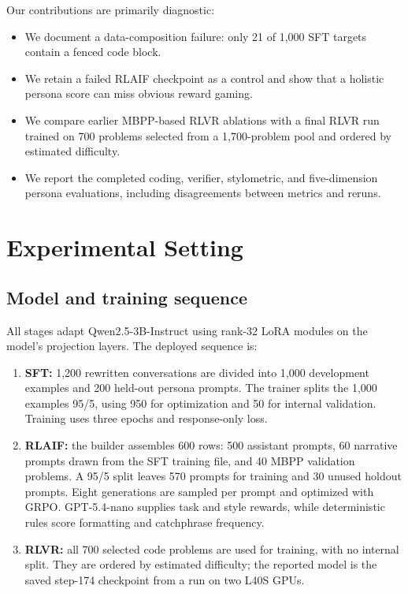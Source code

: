 \documentclass[10pt,twocolumn]{article}
\begin{document}
Our contributions are primarily diagnostic:
\begin{itemize}
    \item We document a data-composition failure: only 21 of 1,000 SFT targets contain
    a fenced code block.
    \item We retain a failed RLAIF checkpoint as a control and show that a holistic
    persona score can miss obvious reward gaming.
    \item We compare earlier MBPP-based RLVR ablations with a final RLVR run trained on
    700 problems selected from a 1,700-problem pool and ordered by estimated difficulty.
    \item We report the completed coding, verifier, stylometric, and five-dimension
    persona evaluations, including disagreements between metrics and reruns.
\end{itemize}

\section{Experimental Setting}

\subsection{Model and training sequence}

All stages adapt Qwen2.5-3B-Instruct using rank-32 LoRA modules on the model's projection
layers. The deployed sequence is:
\begin{enumerate}
    \item \textbf{SFT:} 1,200 rewritten conversations are divided into 1,000 development
    examples and 200 held-out persona prompts. The trainer splits the 1,000 examples
    95/5, using 950 for optimization and 50 for internal validation. Training uses three
    epochs and response-only loss.
    \item \textbf{RLAIF:} the builder assembles 600 rows: 500 assistant prompts, 60
    narrative prompts drawn from the SFT training file, and 40 MBPP validation problems.
    A 95/5 split leaves 570 prompts for training and 30 unused holdout prompts. Eight
    generations are sampled per prompt and optimized with GRPO. GPT-5.4-nano supplies
    task and style rewards, while deterministic rules score formatting and catchphrase
    frequency.
    \item \textbf{RLVR:} all 700 selected code problems are used for training, with no
    internal split. They are ordered by estimated difficulty; the reported model is the
    saved step-174 checkpoint from a run on two L40S GPUs.
\end{enumerate}
\end{document}
